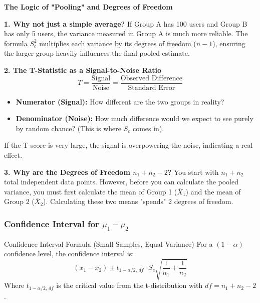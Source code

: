 \vspace{0.2cm}
\begin{example}{\textbf{The Logic of "Pooling" and Degrees of Freedom}}

\textbf{1. Why not just a simple average?} 
If Group A has 100 users and Group B has only 5 users, the variance measured in Group A is much more reliable. The formula $S_c^2$ multiplies each variance by its degrees of freedom ($n-1$), ensuring the larger group heavily influences the final pooled estimate.

\vspace{0.2cm}
\textbf{2. The T-Statistic as a Signal-to-Noise Ratio}
$$ T = \frac{\text{Signal}}{\text{Noise}} = \frac{\text{Observed Difference}}{\text{Standard Error}} $$
\begin{itemize}
    \item \textbf{Numerator (Signal):} How different are the two groups in reality?
    \item \textbf{Denominator (Noise):} How much difference would we expect to see purely by random chance? (This is where $S_c$ comes in).
\end{itemize}
If the T-score is very large, the signal is overpowering the noise, indicating a real effect.

\vspace{0.2cm}
\textbf{3. Why are the Degrees of Freedom $n_1 + n_2 - 2$?}
You start with $n_1 + n_2$ total independent data points. However, before you can calculate the pooled variance, you must first calculate the mean of Group 1 ($\bar{X}_1$) and the mean of Group 2 ($\bar{X}_2$). Calculating these two means "spends" 2 degrees of freedom.
\end{example}

\subsubsection{Confidence Interval for $\mu_1 - \mu_2$}

\begin{defbox}{Confidence Interval Formula (Small Samples, Equal Variance)}
For a $(1-\alpha)$ confidence level, the confidence interval is:
\begin{equation}
    (\overline{x}_{1}-\overline{x}_{2}) \pm t_{1-\alpha/2, \, df} \cdot S_{c}\sqrt{\frac{1}{n_{1}}+\frac{1}{n_{2}}}
\end{equation} 
Where $t_{1-\alpha/2, \, df}$ is the critical value from the t-distribution with $df = n_1+n_2-2$.
\end{defbox}

